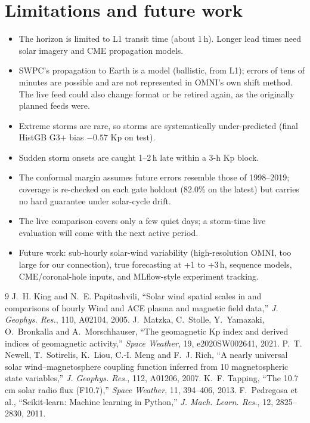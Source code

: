 \documentclass[11pt,a4paper]{article}
\begin{document}
\section{Limitations and future work}
\begin{itemize}
\item The horizon is limited to L1 transit time (about 1\,h). Longer lead times need solar imagery and CME
propagation models.
\item SWPC's propagation to Earth is a model (ballistic, from L1); errors of tens of minutes are possible
and are not represented in OMNI's own shift method. The live feed could also change format or be retired again,
as the originally planned feeds were.
\item Extreme storms are rare, so storms are systematically under-predicted (final HistGB G3+ bias $-0.57$ Kp on test).
\item Sudden storm onsets are caught 1--2\,h late within a 3-h Kp block.
\item The conformal margin assumes future errors resemble those of 1998--2019; coverage is re-checked on each
gate holdout (82.0\% on the latest) but carries no hard guarantee under solar-cycle drift.
\item The live comparison covers only a few quiet days; a storm-time live evaluation will come with the next
active period.
\item Future work: sub-hourly solar-wind variability (high-resolution OMNI, too large for our connection), true
forecasting at +1 to +3\,h, sequence models, CME/coronal-hole inputs, and MLflow-style experiment tracking.
\end{itemize}

\begin{thebibliography}{9}
 J.~H. King and N.~E. Papitashvili, ``Solar wind spatial scales in and comparisons of hourly
Wind and ACE plasma and magnetic field data,'' \emph{J. Geophys. Res.}, 110, A02104, 2005.
 J.~Matzka, C.~Stolle, Y.~Yamazaki, O.~Bronkalla and A.~Morschhauser, ``The geomagnetic Kp
index and derived indices of geomagnetic activity,'' \emph{Space Weather}, 19, e2020SW002641, 2021.
 P.~T. Newell, T.~Sotirelis, K.~Liou, C.-I. Meng and F.~J. Rich, ``A nearly universal solar
wind--magnetosphere coupling function inferred from 10 magnetospheric state variables,'' \emph{J. Geophys. Res.},
112, A01206, 2007.
 K.~F. Tapping, ``The 10.7\,cm solar radio flux (F10.7),'' \emph{Space Weather}, 11,
394--406, 2013.
 F.~Pedregosa et al., ``Scikit-learn: Machine learning in Python,'' \emph{J. Mach. Learn.
Res.}, 12, 2825--2830, 2011.
\end{thebibliography}
\end{document}
